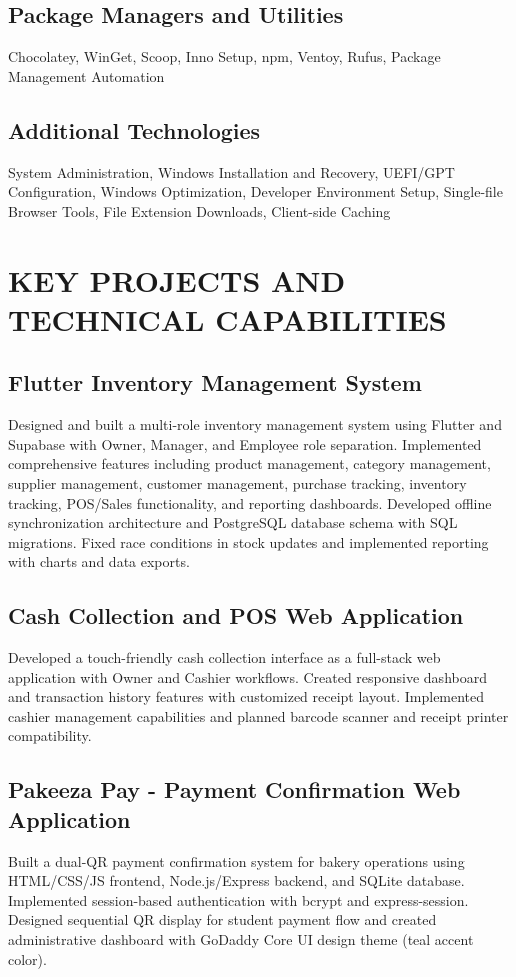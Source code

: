 \documentclass[11pt,letterpaper]{article}
\begin{document}
\subsection*{Package Managers and Utilities}
Chocolatey, WinGet, Scoop, Inno Setup, npm, Ventoy, Rufus, Package Management Automation

\subsection*{Additional Technologies}
System Administration, Windows Installation and Recovery, UEFI/GPT Configuration, Windows Optimization, Developer Environment Setup, Single-file Browser Tools, File Extension Downloads, Client-side Caching

\section*{KEY PROJECTS AND TECHNICAL CAPABILITIES}

\subsection*{Flutter Inventory Management System}
Designed and built a multi-role inventory management system using Flutter and Supabase with Owner, Manager, and Employee role separation. Implemented comprehensive features including product management, category management, supplier management, customer management, purchase tracking, inventory tracking, POS/Sales functionality, and reporting dashboards. Developed offline synchronization architecture and PostgreSQL database schema with SQL migrations. Fixed race conditions in stock updates and implemented reporting with charts and data exports.

\subsection*{Cash Collection and POS Web Application}
Developed a touch-friendly cash collection interface as a full-stack web application with Owner and Cashier workflows. Created responsive dashboard and transaction history features with customized receipt layout. Implemented cashier management capabilities and planned barcode scanner and receipt printer compatibility.

\subsection*{Pakeeza Pay - Payment Confirmation Web Application}
Built a dual-QR payment confirmation system for bakery operations using HTML/CSS/JS frontend, Node.js/Express backend, and SQLite database. Implemented session-based authentication with bcrypt and express-session. Designed sequential QR display for student payment flow and created administrative dashboard with GoDaddy Core UI design theme (teal accent color).
\end{document}

